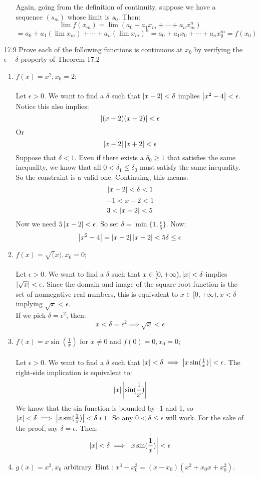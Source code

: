 \begin{enumerate}
\begin{enumerate}
        Again, going from the definition of continuity, suppose we have a sequence $(s_m)$ whose limit is $s_0$. Then:
        $$\lim_{} f(x_m) = \lim_{} (a_0 + a_1x_m + \cdots + a_nx_m^n) $$
        $$ = a_0 + a_1(\lim_{} x_m) + \cdots + a_n (\lim_{} x_m)^n = a_0 + a_1x_0 + \cdots + a_nx_0^m = f(x_0)$$
    \end{enumerate}
  \item [17.9]
    Prove each of the following functions is continuous at $x_0$ by verifying the $\epsilon-\delta$ property of Theorem 17.2
    \begin{enumerate}
      \item $f(x) = x^2, x_0 = 2$;\\\\

        Let $\epsilon > 0$. We want to find a $\delta$ such that $\left\vert x - 2 \right\vert < \delta$ implies $\left\vert x^2 - 4 \right\vert < \epsilon$. Notice this also implies:
        $$\left\vert (x-2)(x+2) \right\vert < \epsilon$$
        Or
        $$\left\vert x-2 \right\vert \left\vert x+2 \right\vert < \epsilon$$
        Suppose that $\delta < 1$. Even if there exists a $\delta_0 \geq 1$ that satisfies the same inequality, we know that all $0 < \delta_1 \leq \delta_0$ must satisfy the same inequality. So the constraint is a valid one. Continuing, this means:
        $$\left\vert x-2 \right\vert < \delta < 1$$
        $$-1 < x-2 < 1$$
        $$3 < \left\vert x+2 \right\vert < 5$$
        Now we need $5 \left\vert x-2 \right\vert < \epsilon$. So set $\delta = \min \{1, \frac{\epsilon}{5} \}$. Now:
        $$\left\vert x^2 - 4 \right\vert = \left\vert x-2 \right\vert \left\vert x+2 \right\vert < 5 \delta \leq \epsilon$$
      \item $f(x) = \sqrt(x), x_0 = 0$;\\\\

        Let $\epsilon > 0$. We want to find a $\delta$ such that $x \in [0, + \infty), \left\vert x \right\vert < \delta$ implies $\left\vert \sqrt{x} \right\vert < \epsilon$. Since the domain and image of the square root function is the set of nonnegative real numbers, this is equivalent to $x \in [0, + \infty), x < \delta$ implying $\sqrt{x} < \epsilon$.\\

        If we pick $\delta = \epsilon^2$, then:
        $$x < \delta = \epsilon^2 \implies \sqrt{x} < \epsilon$$
      \item $f(x) = x \sin(\frac{1}{x})$ for $x \neq 0$ and $f(0) = 0, x_0 = 0$;\\\\

        Let $\epsilon > 0$. We want to find a $\delta$ such that $\left\vert x \right\vert < \delta \implies \left\vert x \sin(\frac{1}{x}) \right\vert < \epsilon$. The right-side implication is equivalent to:
        $$\left\vert x \right\vert \left\vert \sin(\frac{1}{x}) \right\vert$$
        We know that the sin function is bounded by -1 and 1, so $\left\vert x \right\vert < \delta \implies \left\vert x \sin(\frac{1}{x}) \right\vert < \delta * 1$. So any $0 < \delta \leq \epsilon$ will work. For the sake of the proof, say $\delta = \epsilon$. Then:
        $$\left\vert x \right\vert < \delta \implies \left\vert x \sin(\frac{1}{x}) \right\vert < \epsilon$$
      \item $g(x) = x^3, x_0$ arbitrary. Hint : $x^3 - x_0^3 = (x-x_0)(x^2 + x_0x + x_0^2)$.\\\\


\end{enumerate}
\end{enumerate}
